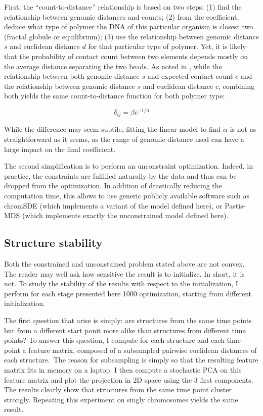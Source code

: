 \documentclass[letterpaper,12pt]{article}
\begin{document}
First, the ``count-to-distance'' relationship is based on two steps: (1) find
the relationship between genomic distances and counts; (2) from the
coefficient, deduce what type of polymer the DNA of this particular organism
is closest two (fractal globule or equilibrium); (3) use the relationship
between genomic distance $s$ and euclidean distance $d$ for that particular
type of polymer. Yet, it is likely that the probability of contact count
between two elements depends mostly on the average distance separating the two
beads. As noted in \citet{varoquaux:statistical}, while the relationship
between both genomic distance $s$ and expected contact count $c$ and the
relationship between genomic distance $s$ and euclidean distance $c$,
combining both yields the same count-to-distance function for both polymer
type:

\begin{equation}
\delta_{ij} = \beta c^{-1/3}
\end{equation}

While the difference may seem subtile, fitting the linear model to find
$\alpha$ is not as straightforward as it seems, as the range of genomic
distance used can have a large impact on the final coefficient.

The second simplification is to perform an unconstraint optimization. Indeed,
in practice, the constraints are fulfilled naturally by the data and thus can
be dropped from the optimization. In addition of drastically reducing the
computation time, this allows to use generic publicly available software such
as chromSDE (which implements a variant of the model defined here), or
Pastis-MDS (which implements exactly the unconstrained model defined here).

\subsection{Structure stability}

Both the constrained and unconstained problem stated above are not convex. The
reader may well ask how sensitive the result is to initialize. In short, it is
not. To study the stability of the results with respect to the initialization,
I perform for each stage presented here 1000 optimization, starting from
different initialization. 

The first question that arise is simply: are structures from the same time
points but from a different start ponit more alike than structures from
different time points? To answer this question, I compute for each structure
and each time point a feature matrix, composed of a subsampled pairwise
euclidean distances of each structure. The reason for subsampling is simply so
that the resulting feature matrix fits in memory on a laptop. I then compute a
stochastic PCA on this feature matrix and plot the projection in 2D space
using the 3 first components. The results clearly show that structures from
the same time point cluster strongly. Repeating this experiment on singly
chromosomes yields the same result.
\end{document}
